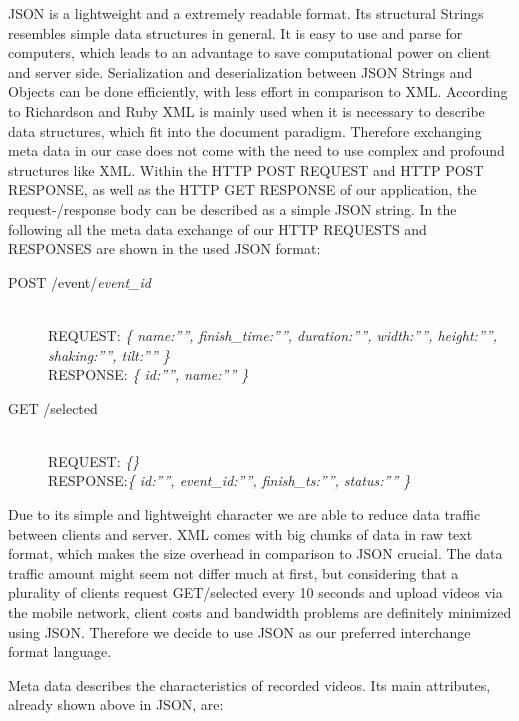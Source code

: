\documentclass[conference]{IEEEtran}
\begin{document}
JSON is a lightweight and a extremely readable format. Its structural Strings resembles simple data structures in general. 
It is easy to use and parse for computers, which leads to an advantage to save computational power on client and server side. 
Serialization and deserialization between JSON Strings and Objects can be done efficiently, with less effort in comparison to XML.
According to Richardson and Ruby XML is mainly used when it is necessary to describe data structures, which fit into the document paradigm. 
Therefore exchanging meta data in our case does not come with the need to use complex and profound structures like XML. 
Within the HTTP POST REQUEST and HTTP POST RESPONSE, as well as the HTTP GET RESPONSE  of our application, 
the request-/response body can be described as a simple JSON string. In the following all the meta data exchange of our HTTP REQUESTS and 
RESPONSES are shown in the used JSON format:

\begin{description}
	\item[POST /event/\textit{event\_id}]\hfill\\	
				REQUEST: \textit{\{ name:””, finish\_time:””, duration:””, width:””, height:””, shaking:””, tilt:”” \}}\hfill \\
				RESPONSE: \textit{\{ id:””, name:”” \}}

	\item[GET /selected]\hfill\\		
				REQUEST: \textit{\{\}}\hfill \\
				RESPONSE:\textit{\{ id:””, event\_id:””, finish\_ts:””, status:”” \}}

\end{description}

Due to its simple and lightweight character we are able to reduce data traffic between clients and server. 
XML comes with big chunks of data in raw text format, which makes the size overhead in comparison to JSON crucial.
The data traffic amount might seem not differ much at first, but considering that a plurality of clients request GET/selected every 10 seconds and upload videos via the mobile network, client costs and bandwidth problems are definitely minimized using JSON. Therefore we decide to use JSON as our preferred interchange format language.

Meta data describes the characteristics of recorded videos. Its main attributes, already shown above in JSON, are:
\end{document}
